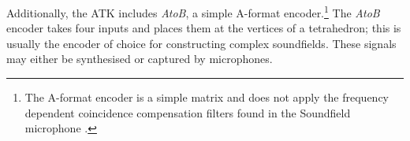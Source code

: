 \documentclass{article}
\begin{document}
Additionally, the ATK includes \emph{AtoB}, a simple A-format encoder.\footnote{The A-format encoder is a simple matrix and does not apply the frequency dependent coincidence compensation filters found in the Soundfield microphone \cite{farrar:1979soundfield}.} The \emph{AtoB} encoder takes four inputs and places them at the vertices of a tetrahedron; this is usually the encoder of choice for constructing complex soundfields. These signals may either be synthesised or captured by microphones.




\end{document}
